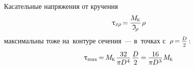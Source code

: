 \documentclass[14pt]{extarticle}
\begin{document}
Касательные напряжения от кручения
\[
\uptau_{\scalebox{.8}{$x \hspace{-.1ex} \rho$}} \hspace{-0.25ex}=\hspace{-0.1ex}
\displaystyle\frac{M_{\hspace{-0.1ex}\mathrm{\scalebox{.6}{K}}}}{\mathfrak{I}_{\hspace{-0.2ex}\scalebox{.8}{$\rho$}}} \hspace{.25ex} \rho
\]
максимальны тоже на~контуре сечения~--- в~точках с~${\hspace{.1ex}\rho \hspace{-.2ex}=\hspace{-.15ex} \scalebox{.82}{$ \displaystyle\frac{\raisebox{-.2em}{$D$}}{2} $}\hspace{.2ex}}$:
\[
\uptau_{\scalebox{.75}{max}} \hspace{-.25ex}
= \hspace{-.2ex} M_{\hspace{-0.1ex}\mathrm{\scalebox{.6}{K}}}\hspace{.2ex}
\displaystyle\frac{\raisebox{-.2em}{$32$}}{\pi \hspace{-0.1ex} D^{\hspace{.1ex}4}} \hspace{.25ex} \displaystyle\frac{\raisebox{-.2em}{$D$}}{2}
\hspace{-.1ex}= \hspace{-.1ex}
\displaystyle\frac{\raisebox{-.2em}{$16$}}{\pi \hspace{-0.1ex} D^{\hspace{.1ex}3}} \hspace{.1ex}
M_{\hspace{-0.1ex}\mathrm{\scalebox{.6}{K}}}
\]
\end{document}
